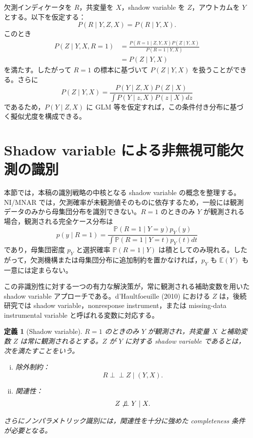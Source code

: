 \documentclass[dvipdfmx,autodetect-engine]{jsarticle}
\newtheorem{definition}{定義}
\newcommand{\indep}{\mathrel{\perp\!\!\!\perp}}
\newcommand{\E}{\mathbb{E}}
\newcommand{\Prb}{\mathbb{P}}
\newcommand{\1}{\mathbf{1}}
\begin{document}
欠測インディケータを $R$，共変量を $X$，shadow variable を $Z$，アウトカムを $Y$ とする。以下を仮定する：
\begin{equation}
  P(R\mid Y,Z,X)=P(R\mid Y,X).
\end{equation}
このとき
\begin{align}
P(Z\mid Y,X,R=1)
&=\frac{P(R=1\mid Z,Y,X)P(Z\mid Y,X)}{P(R=1\mid Y,X)}\\
&=P(Z\mid Y,X)
\end{align}
を満たす。したがって $R=1$ の標本に基づいて $P(Z\mid Y,X)$ を扱うことができる。さらに
\begin{equation}
P(Z\mid Y,X)=
\frac{P(Y\mid Z,X)P(Z\mid X)}{\int P(Y\mid z,X)P(z\mid X)dz}
\end{equation}
であるため，$P(Y\mid Z,X)$ に GLM 等を仮定すれば，この条件付き分布に基づく擬似尤度を構成できる。

\section{Shadow variable による非無視可能欠測の識別}
\label{sec:shadow-variable-review}

本節では，本稿の識別戦略の中核となる shadow variable の概念を整理する。NI/MNAR では，欠測確率が未観測値そのものに依存するため，一般には観測データのみから母集団分布を識別できない。$R=1$ のときのみ $Y$ が観測される場合，観測される完全ケース分布は
\begin{equation}
  p(y\mid R=1)=
  \frac{\Prb(R=1\mid Y=y)p_Y(y)}
       {\int \Prb(R=1\mid Y=t)p_Y(t)dt}
  \label{eq:cc-density-shadow-section}
\end{equation}
であり，母集団密度 $p_Y$ と選択確率 $\Prb(R=1\mid Y)$ は積としてのみ現れる。したがって，欠測機構または母集団分布に追加制約を置かなければ，$p_Y$ も $\E(Y)$ も一意には定まらない。

この非識別性に対する一つの有力な解決策が，常に観測される補助変数を用いた shadow variable アプローチである。d'Haultfoeuille (2010) における $Z$ は，後続研究では shadow variable，nonresponse instrument，または missing-data instrumental variable と呼ばれる変数に対応する。

\begin{definition}[Shadow variable]
\label{def:shadow-variable}
$R=1$ のときのみ $Y$ が観測され，共変量 $X$ と補助変数 $Z$ は常に観測されるとする。$Z$ が $Y$ に対する shadow variable であるとは，次を満たすことをいう。
\begin{enumerate}[(i)]
  \item 除外制約：
  \begin{equation}
    R\indep Z\mid (Y,X).
    \label{eq:shadow-exclusion}
  \end{equation}
  \item 関連性：
  \begin{equation}
    Z\not\indep Y\mid X.
    \label{eq:shadow-relevance}
  \end{equation}
\end{enumerate}
さらにノンパラメトリック識別には，関連性を十分に強めた completeness 条件が必要となる。
\end{definition}
\end{document}
